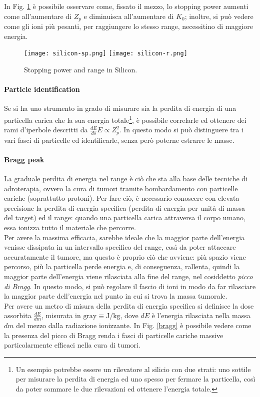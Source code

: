 In Fig. \ref{silicon} è possibile osservare come, fissato il mezzo, lo stopping power aumenti come all'aumentare di $ Z_p $ e diminuisca all'aumentare di $ K_0 $; inoltre, si può vedere come gli ioni più pesanti, per raggiungere lo stesso range, necessitino di maggiore energia.

\begin{figure}[!b]
	\centering
	\texttt{[image: silicon-sp.png]}
	\texttt{[image: silicon-r.png]}
	\caption{Stopping power and range in Silicon.}
	\label{silicon}
\end{figure}

\paragraph{Particle identification}

Se si ha uno strumento in grado di misurare sia la perdita di energia di una particella carica che la sua energia totale\footnote{Un esempio potrebbe essere un rilevatore al silicio con due strati: uno sottile per misurare la perdita di energia ed uno spesso per fermare la particella, così da poter sommare le due rilevazioni ed ottenere l'energia totale.}, è possibile correlarle ed ottenere dei rami d'iperbole descritti da $ \frac{dE}{ds} E \propto Z_p^2 $. In questo modo si può distinguere tra i vari fasci di particelle ed identificarle, senza però poterne estrarre le masse.

\paragraph{Bragg peak}

La graduale perdita di energia nel range è ciò che sta alla base delle tecniche di adroterapia, ovvero la cura di tumori tramite bombardamento con particelle cariche (soprattutto protoni). Per fare ciò, è necessario conoscere con elevata precisione la perdita di energia specifica (perdita di energia per unità di massa del target) ed il range: quando una particella carica attraversa il corpo umano, essa ionizza tutto il materiale che percorre.\\
Per avere la massima efficacia, sarebbe ideale che la maggior parte dell'energia venisse dissipata in un intervallo specifico del range, così da poter attaccare accuratamente il tumore, ma questo è proprio ciò che avviene: più spazio viene percorso, più la particella perde energia e, di conseguenza, rallenta, quindi la maggior parte dell'energia viene rilasciata alla fine del range, nel cosiddetto \textit{picco di Bragg}. In questo modo, si può regolare il fascio di ioni in modo da far rilasciare la maggior parte dell'energia nel punto in cui si trova la massa tumorale.\\
Per avere un metro di misura della perdita di energia specifica si definisce la dose assorbita $ \frac{dE}{dm} $, misurata in $ \text{gray} \equiv \text{J} / \text{kg} $, dove $ dE $ è l'energia rilasciata nella massa $ dm $ del mezzo dalla radiazione ionizzante. In Fig. \ref{bragg} è possibile vedere come la presenza del picco di Bragg renda i fasci di particelle cariche massive particolarmente efficaci nella cura di tumori.

